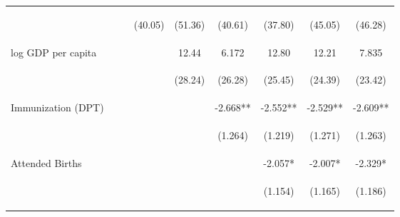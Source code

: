 \begin{landscape}
\begin{table}[htpb!]
\begin{center}
\begin{tabular}{lcccccccc}
&&&\begin{footnotesize}(40.05)\end{footnotesize}&\begin{footnotesize}(51.36)\end{footnotesize}&\begin{footnotesize}(40.61)\end{footnotesize}&\begin{footnotesize}(37.80)\end{footnotesize}&\begin{footnotesize}(45.05)\end{footnotesize}&\begin{footnotesize}(46.28)\end{footnotesize}\\
log GDP per capita&&&&12.44&6.172&12.80&12.21&7.835\\
&&&&\begin{footnotesize}(28.24)\end{footnotesize}&\begin{footnotesize}(26.28)\end{footnotesize}&\begin{footnotesize}(25.45)\end{footnotesize}&\begin{footnotesize}(24.39)\end{footnotesize}&\begin{footnotesize}(23.42)\end{footnotesize}\\
Immunization (DPT) &&&&&-2.668**&-2.552**&-2.529**&-2.609**\\
&&&&&\begin{footnotesize}(1.264)\end{footnotesize}&\begin{footnotesize}(1.219)\end{footnotesize}&\begin{footnotesize}(1.271)\end{footnotesize}&\begin{footnotesize}(1.263)\end{footnotesize}\\
Attended Births&&&&&&-2.057*&-2.007*&-2.329*\\
&&&&&&\begin{footnotesize}(1.154)\end{footnotesize}&\begin{footnotesize}(1.165)\end{footnotesize}&\begin{footnotesize}(1.186)\end{footnotesize}\\

\end{tabular}
\end{center}
\end{table}
\end{landscape}
